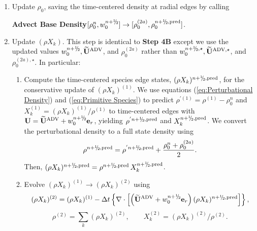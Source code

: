 \begin{description}
\begin{enumerate}
\renewcommand{\theenumi}{{\bf \Alph{enumi}}}

\item Update $\rho_0$, saving the time-centered density at radial edges by calling

{\bf Advect Base Density}$[\rho_0^{n},w_0^{\nph}] \rightarrow [\rho_0^{(2a)}, \rho_0^{\nph,\pred}]$.

\item Update $(\rho X_k)$.  This step is identical to {\bf Step 4B} except we use
  the updated values $w_0^{\nph}, \uadvtwo$, and $\rho_0^{(2a)}$ rather than 
  $w_0^{\nph,\star}, \uadvone$, and $\rho_0^{(2a),\star}$.  In particular:

\begin{enumerate}
\renewcommand{\labelenumii}{{\bf \roman{enumii}}.}

\item Compute the time-centered species edge states, $(\rho X_k)^{\nph,\pred}$,
  for the conservative update of $(\rho X_k)^{(1)}$.  We use equations 
  (\ref{eq:Perturbational Density}) and (\ref{eq:Primitive Species}) to 
  predict $\rho^{'(1)} = \rho^{(1)} - \rho_0^n$ and 
  $X_k^{(1)} = (\rho  X_k)^{(1)} / \rho^{(1)}$ to time-centered edges
  with $\Ub = \uadvtwo+w_0^{\nph} \eb_r$,
  yielding $\rho^{'\nph,\pred}$ and $X_k^{\nph,\pred}$.  
  We convert the perturbational density to a full state density using
\begin{equation}
\rho^{\nph,\pred} = \rho^{'\nph,\pred} + \frac{\rho_0^n + \rho_0^{(2a)}}{2}.
\end{equation}
  Then, $(\rho X_k)^{\nph,\pred} = \rho^{\nph,\pred} \, X_k^{\nph,\pred}$.

\item Evolve $(\rho X_k)^{(1)} \rightarrow (\rho X_k)^{(2)}$ using
\begin{equation}
(\rho X_k)^{(2)} = (\rho X_k)^{(1)} 
- \dt \left\{ \nabla \cdot \left[\left(\uadvtwo+w_0^{\nph} \eb_r\right)  
(\rho X_k)^{\nph,\pred} \right] \right\},
\end{equation}
\begin{equation}
\rho^{(2)} = \sum_k (\rho X_k)^{(2)},
\qquad
X_k^{(2)} = (\rho X_k)^{(2)} / \rho^{(2)}.
\end{equation}

\end{enumerate}


\end{enumerate}
\end{description}

